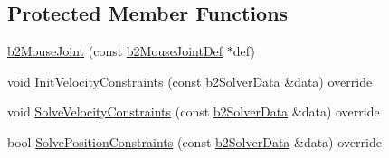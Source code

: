 \subsection*{Protected Member Functions}
\begin{DoxyCompactItemize}
\item 
\mbox{\hyperlink{classb2_mouse_joint_ad147d7989d884952c3389f7e5e3acf68}{b2\+Mouse\+Joint}} (const \mbox{\hyperlink{structb2_mouse_joint_def}{b2\+Mouse\+Joint\+Def}} $\ast$def)
\item 
void \mbox{\hyperlink{classb2_mouse_joint_a02c342a98cfa5687de2bd3dba7c700b1}{Init\+Velocity\+Constraints}} (const \mbox{\hyperlink{structb2_solver_data}{b2\+Solver\+Data}} \&data) override
\item 
void \mbox{\hyperlink{classb2_mouse_joint_a9256297320a1a67e9dc49b70f4798dd8}{Solve\+Velocity\+Constraints}} (const \mbox{\hyperlink{structb2_solver_data}{b2\+Solver\+Data}} \&data) override
\item 
bool \mbox{\hyperlink{classb2_mouse_joint_a13f9ec996eff59c15e6330a8c3f5ba9f}{Solve\+Position\+Constraints}} (const \mbox{\hyperlink{structb2_solver_data}{b2\+Solver\+Data}} \&data) override
\end{DoxyCompactItemize}
